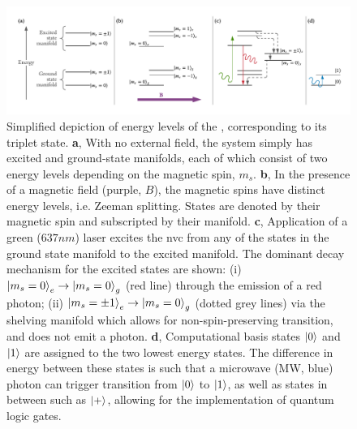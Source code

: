 \begin{figure}
    \begin{center}
        \includegraphics[width=0.8\linewidth]{experimental_study/figures/nv_centre_cartoon.pdf}
    \end{center}
    \caption[ energy levels.]{
        Simplified depiction of energy levels of the , corresponding to its triplet state. 
        \textbf{a}, With no external field, the system simply has excited and ground-state manifolds, 
        each of which consist of two energy levels depending on the magnetic spin, $m_s$.
        \textbf{b}, In the presence of a magnetic field (purple, $B$), the magnetic spins have distinct energy levels, 
        i.e. Zeeman splitting. 
        States are denoted by their magnetic spin and subscripted by their manifold. 
        \textbf{c},  Application of a green ($637nm$) laser excites the \gls{nvc} from any of the states in the 
        ground state manifold to the excited manifold. 
        The dominant decay mechanism for the excited states are shown: 
            (i) $\ket{m_s=0}_e \rightarrow \ket{m_s=0}_g$ (red line) through the emission of a red photon;
            (ii) $\ket{m_s=\pm 1}_e \rightarrow \ket{m_s=0}_g$ (dotted grey lines) via the shelving manifold which allows for non-spin-preserving transition, 
            and does not emit a photon. 
        \textbf{d}, Computational basis states $\ket{0}$ and $\ket{1}$ are assigned to the two lowest energy states.
            The difference in energy between these states is such that a microwave (MW, blue) photon
            can trigger transition from $\ket{0}$ to $\ket{1}$, as well as states in between such as $\ket{+}$, 
            allowing for the implementation of quantum logic gates. 
    }
    \label{fig:nv_centre_energy_levels}
\end{figure}


